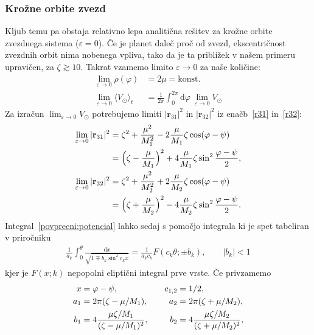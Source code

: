\documentclass[12pt, a4paper]{article}
\renewcommand{\r}{
    \ensuremath{\mathbf{r}}
}
\renewcommand{\d}{
    \ensuremath{\mathrm{d}}
}
\begin{document}
\subsubsection{Kro\v zne orbite zvezd}
Kljub temu pa obstaja relativno lepa analiti\v cna re\v sitev za kro\v zne orbite zvezdnega sistema ($\varepsilon = 0$).
\v Ce je planet dale\v c pro\v c od zvezd, ekscentri\v cnost zvezdnih orbit nima nobenega vpliva, tako da je ta
pribli\v zek v na\v sem primeru upravi\v cen, za $\zeta \gtrsim 10$. Takrat vzamemo limito $\varepsilon \to 0$ za na\v se
koli\v cine:
\begin{align}
	\lim_{\varepsilon \to 0} \rho (\varphi) &= 2\mu = \text{konst.} \\
	\lim_{\varepsilon \to 0} \langle V_\odot \rangle_t &= \frac{1}{2\pi}\int_0^{2\pi} \d \varphi\ \lim_{\varepsilon \to 0}
		V_\odot
	\label{povprecni:potencial}
\end{align}
Za izra\v cun $\lim_{\varepsilon \to 0} V_\odot$ potrebujemo limiti $|\r_{31}|^2$ in $|\r_{32}|^2$ iz ena\v cb~\eqref{r31}
in~\eqref{r32}:
\begin{align}
	\lim_{\varepsilon \to 0} |\r_{31}|^2 &= \zeta^2 + \frac{\mu^2}{M_1^2} - 2\frac{\mu}{M_1}\zeta
			\cos(\varphi - \psi) \notag \\
		&= \Big(\zeta - \frac{\mu}{M_1}\Big)^2 + 4\frac{\mu}{M_1}\zeta\sin^2\frac{\varphi - \psi}{2}, \\
	\lim_{\varepsilon \to 0} |\r_{32}|^2 &= \zeta^2 + \frac{\mu^2}{M_2^2} + 2\frac{\mu}{M_2}\zeta
			\cos(\varphi - \psi) \notag \\
		&= \Big(\zeta + \frac{\mu}{M_2}\Big)^2 - 4\frac{\mu}{M_2}\zeta\sin^2\frac{\varphi - \psi}{2}.
	\label{r32:2mu}
\end{align}
Integral~\eqref{povprecni:potencial} lahko sedaj s pomo\v cjo integrala ki je spet tabeliran v
priro\v cniku~\cite{bronstejn}
\begin{align}
	\frac{1}{a_k}\int_0^\theta \frac{\d x}{\sqrt{1 \mp b_k\sin^2 c_kx}} = \frac{1}{a_kc_k} F(c_k \theta; \pm b_k),
	\qquad  |b_k| < 1
	\label{elipticni}
\end{align}
kjer je $F(x;k)$ nepopolni elipti\v cni integral prve vrste. \v Ce privzamemo
\begin{alignat}{3}
	x &= \varphi - \psi, &\quad c_{1,2} &= 1/2, \notag \\
	a_1 &= 2\pi(\zeta - \mu/M_1), &\quad  a_2 &= 2\pi(\zeta + \mu/M_2), \notag \\
	b_1 &= 4\frac{\mu\zeta/M_1}{(\zeta - \mu/M_1)^2}, &\quad  b_2 &= 4\frac{\mu\zeta/M_2}{(\zeta + \mu/M_2)^2},
	\label{konstante}
\end{alignat}
\end{document}
